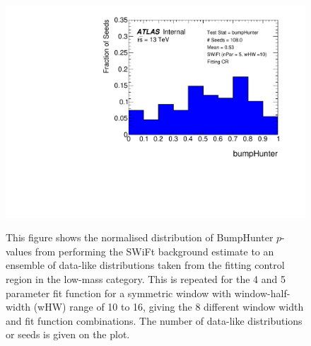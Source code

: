 \begin{figure}[!htb]
 {                                                    
  \includegraphics[width=0.3\linewidth, angle=0]{figs/Dibjet/LowMass/FitStudy/pVal_bumpHunter_corrFitCR_5para_low10_high10.pdf}
}
\vspace{10pt}
\caption{\label{fig:app-bumpH_spuriousSignal}
  This figure shows the normalised distribution of {\sc BumpHunter} $p$-values from performing the SWiFt background estimate to an ensemble of
  data-like distributions taken from the fitting control region in the low-mass category.
  This is repeated for the 4 and 5 parameter fit function for a symmetric window with window-half-width (wHW) range of 10 to 16,
  giving the 8 different window width and fit function combinations.
  The number of data-like distributions or seeds is given on the plot.
}
\end{figure}

